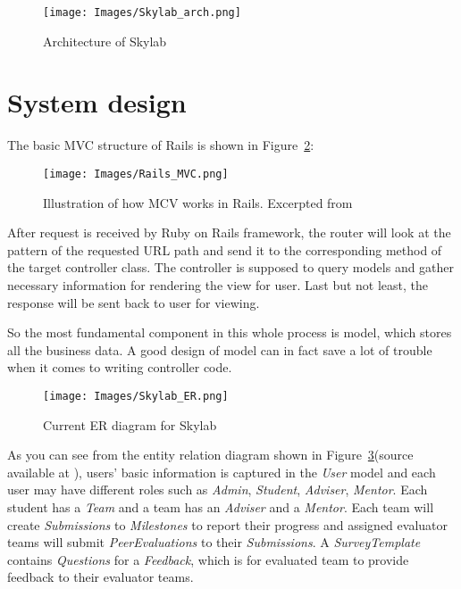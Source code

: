 \begin{figure}[h]
  \centering
  \texttt{[image: Images/Skylab\_arch.png]}
  \caption{Architecture of Skylab}
  \label{fig:Skylabarch}
\end{figure}

\section{System design}

The basic MVC structure of Rails is shown in Figure~\ref{fig:RailsMVC}:

\begin{figure}[h]
  \centering
  \texttt{[image: Images/Rails\_MVC.png]}
  \caption{Illustration of how MCV works in Rails. Excerpted from \cite{citationMVC}}
  \label{fig:RailsMVC}
\end{figure}

After request is received by Ruby on Rails framework, the router will look at the pattern of the requested URL path and send it to the corresponding method of the target controller class. The controller is supposed to query models and gather necessary information for rendering the view for user. Last but not least, the response will be sent back to user for viewing.

So the most fundamental component in this whole process is model, which stores all the business data. A good design of model can in fact save a lot of trouble when it comes to writing controller code.

\begin{figure}[h]
  \centering
  \texttt{[image: Images/Skylab\_ER.png]}
  \caption{Current ER diagram for Skylab}
  \label{fig:SkylabER}
\end{figure}

As you can see from the entity relation diagram shown in Figure~\ref{fig:SkylabER}(source available at \cite{citationERSource}), users' basic information is captured in the \textit{User} model and each user may have different roles such as \textit{Admin}, \textit{Student}, \textit{Adviser}, \textit{Mentor}. Each student has a \textit{Team} and a team has an \textit{Adviser} and a \textit{Mentor}. Each team will create \textit{Submissions} to \textit{Milestones} to report their progress and assigned evaluator teams will submit \textit{PeerEvaluations} to their \textit{Submissions}. A \textit{SurveyTemplate} contains \textit{Questions} for a \textit{Feedback}, which is for evaluated team to provide feedback to their evaluator teams.

